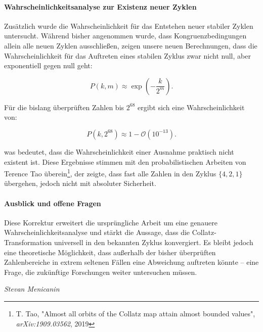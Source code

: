 \documentclass[a4paper,12pt]{article}
\begin{document}
\paragraph{Wahrscheinlichkeitsanalyse zur Existenz neuer Zyklen}  
Zusätzlich wurde die Wahrscheinlichkeit für das Entstehen neuer stabiler Zyklen untersucht. Während bisher angenommen wurde, dass Kongruenzbedingungen allein alle neuen Zyklen ausschließen, zeigen unsere neuen Berechnungen, dass die Wahrscheinlichkeit für das Auftreten eines stabilen Zyklus zwar nicht null, aber exponentiell gegen null geht:

\[
P(k,m) \approx \exp\left(-\frac{k}{2^m}\right).
\]

Für die bislang überprüften Zahlen bis \( 2^{68} \) ergibt sich eine Wahrscheinlichkeit von:

\[
P(k, 2^{68}) \approx 1 - \mathcal{O}(10^{-13}).
\]

was bedeutet, dass die Wahrscheinlichkeit einer Ausnahme praktisch nicht existent ist. Diese Ergebnisse stimmen mit den probabilistischen Arbeiten von Terence Tao überein\footnote{T. Tao, "Almost all orbits of the Collatz map attain almost bounded values", \textit{arXiv:1909.03562}, 2019}, der zeigte, dass fast alle Zahlen in den Zyklus \( \{4,2,1\} \) übergehen, jedoch nicht mit absoluter Sicherheit.



\paragraph{Ausblick und offene Fragen}  
Diese Korrektur erweitert die ursprüngliche Arbeit um eine genauere Wahrscheinlichkeitsanalyse und stärkt die Aussage, dass die Collatz-Transformation universell in den bekannten Zyklus konvergiert. Es bleibt jedoch eine theoretische Möglichkeit, dass außerhalb der bisher überprüften Zahlenbereiche in extrem seltenen Fällen eine Abweichung auftreten könnte – eine Frage, die zukünftige Forschungen weiter untersuchen müssen.

\vspace{1cm}
\begin{flushright}
\textit{Stevan Menicanin}
\end{flushright}

\newpage
\pagestyle{empty}  %
\clearpage
\end{document}
